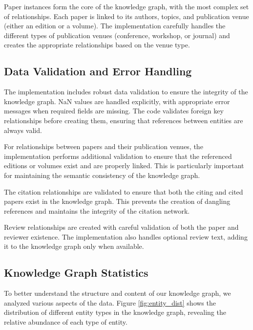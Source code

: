 \documentclass[10pt,a4paper]{article}
\begin{document}
Paper instances form the core of the knowledge graph, with the most complex set of relationships. Each paper is linked to its authors, topics, and publication venue (either an edition or a volume). The implementation carefully handles the different types of publication venues (conference, workshop, or journal) and creates the appropriate relationships based on the venue type.

\subsection{Data Validation and Error Handling}

The implementation includes robust data validation to ensure the integrity of the knowledge graph. NaN values are handled explicitly, with appropriate error messages when required fields are missing. The code validates foreign key relationships before creating them, ensuring that references between entities are always valid.

For relationships between papers and their publication venues, the implementation performs additional validation to ensure that the referenced editions or volumes exist and are properly linked. This is particularly important for maintaining the semantic consistency of the knowledge graph.

The citation relationships are validated to ensure that both the citing and cited papers exist in the knowledge graph. This prevents the creation of dangling references and maintains the integrity of the citation network.

Review relationships are created with careful validation of both the paper and reviewer existence. The implementation also handles optional review text, adding it to the knowledge graph only when available.

\subsection{Knowledge Graph Statistics}

To better understand the structure and content of our knowledge graph, we analyzed various aspects of the data. Figure \ref{fig:entity_dist} shows the distribution of different entity types in the knowledge graph, revealing the relative abundance of each type of entity.
\end{document}
